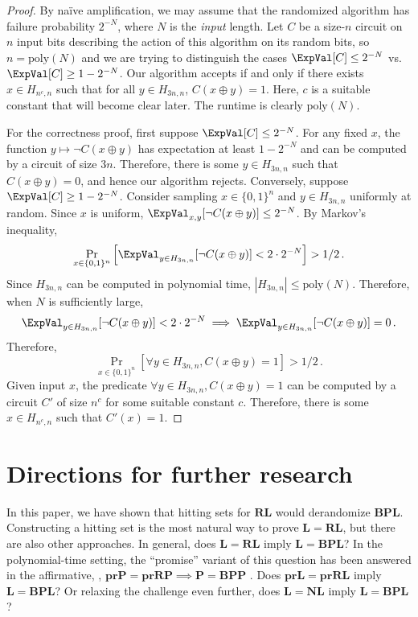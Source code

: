\begin{proof}
By na{\"i}ve amplification, we may assume that the randomized algorithm has failure probability $2^{-N}$, where $N$ is the \emph{input} length. Let $C$ be a size-$n$ circuit on $n$ input bits describing the action of this algorithm on its random bits, so $n = \text{poly}(N)$ and we are trying to distinguish the cases $\ExpVal[C] \leq 2^{-N}$ vs.\ $\ExpVal[C] \geq 1 - 2^{-N}$. Our algorithm accepts if and only if there exists $x \in H_{n^c, n}$ such that for all $y \in H_{3n, n}$, $C(x \oplus y) = 1$. Here, $c$ is a suitable constant that will become clear later. The runtime is clearly $\text{poly}(N)$.

For the correctness proof, first suppose $\ExpVal[C] \leq 2^{-N}$. For any fixed $x$, the function $y \mapsto \neg C(x \oplus y)$ has expectation at least $1 - 2^{-N}$ and can be computed by a circuit of size $3n$. Therefore, there is some $y \in H_{3n, n}$ such that $C(x \oplus y) = 0$, and hence our algorithm rejects. Conversely, suppose $\ExpVal[C] \geq 1 - 2^{-N}$. Consider sampling $x \in \{0, 1\}^n$ and $y \in H_{3n, n}$ uniformly at random. Since $x$ is uniform, $\ExpVal_{x, y}[\neg C(x \oplus y)] \leq 2^{-N}$. By Markov's inequality,
$$
\Pr_{x \in \{0, 1\}^n}\left[\ExpVal_{y \in H_{3n, n}}[\neg C(x \oplus y)] < 2 \cdot 2^{-N}\right] > 1/2\,.
$$
Since $H_{3n, n}$ can be computed in polynomial time, $|H_{3n, n}| \leq \text{poly}(N)$. Therefore, when $N$ is sufficiently large,
$$
\ExpVal_{y \in H_{3n, n}}[\neg C(x \oplus y)] < 2 \cdot 2^{-N} \implies \ExpVal_{y \in H_{3n, n}}[\neg C(x \oplus y)] = 0\,.
$$
Therefore,
$$
\Pr_{x \in \{0, 1\}^n}\left[ \forall y \in H_{3n, n}, C(x \oplus y) = 1 \right] > 1/2\,.
$$
Given input $x$, the predicate $\forall y \in H_{3n, n}, C(x \oplus y) = 1$ can be computed by a circuit $C'$ of size $n^c$ for some suitable constant $c$. Therefore, there is some $x \in H_{n^c, n}$ such that $C'(x) = 1$.
\end{proof}

\section{Directions for further research}

In this paper, we have shown that hitting sets for $\mathbf{RL}$ would derandomize $\mathbf{BPL}$. Constructing a hitting set is the most natural way to prove $\mathbf{L} = \mathbf{RL}$, but there are also other approaches. In general, does $\mathbf{L} = \mathbf{RL}$ imply $\mathbf{L}= \mathbf{BPL}$? In the polynomial-time setting, the ``promise'' variant of this question has been answered in the affirmative, \ie, $\mathbf{prP} = \mathbf{prRP} \implies \mathbf{P} = \mathbf{BPP}$ \cite{BF99}. Does $\mathbf{prL} = \mathbf{prRL}$ imply $\mathbf{L}= \mathbf{BPL}$? Or relaxing the challenge even further, does $\mathbf{L} = \mathbf{NL}$ imply $\mathbf{L}= \mathbf{BPL}$?

